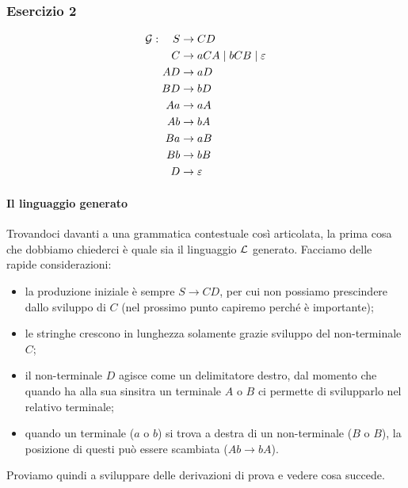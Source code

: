 \documentclass[class=book, crop=false, oneside, 12pt]{standalone}
\begin{document}
  \subsubsection{Esercizio 2}
  \begin{align*}
    \mathcal{G}: \quad S &\to CD \\
    C &\to aCA \mid bCB \mid \varepsilon \\
    AD &\to aD \\
    BD &\to bD \\ \notag
    Aa &\to aA \\
    Ab &\to bA \\ \notag
    Ba &\to aB \\ \notag
    Bb &\to bB \\ \notag
    D &\to \varepsilon \notag
  \end{align*}
  \paragraph{Il linguaggio generato}
  Trovandoci davanti a una grammatica contestuale così articolata, la prima cosa che dobbiamo chiederci è quale sia il linguaggio \(\mathcal{L}\) generato. Facciamo delle rapide considerazioni:
  \begin{itemize}
    \item la produzione iniziale è sempre \(S \to CD\), per cui non possiamo prescindere dallo sviluppo di \(C\) (nel prossimo punto capiremo perché è importante);
    \item le stringhe crescono in lunghezza solamente grazie sviluppo del non-terminale \(C\);
    \item il non-terminale \(D\) agisce come un delimitatore destro, dal momento che quando ha alla sua sinsitra un terminale \(A\) o \(B\) ci permette di svilupparlo nel relativo terminale;
    \item quando un terminale (\(a\) o \(b\)) si trova a destra di un non-terminale (\(B\) o \(B\)), la posizione di questi può essere scambiata (\(Ab \to bA\)).
  \end{itemize}
  Proviamo quindi a sviluppare delle derivazioni di prova e vedere cosa succede.
\end{document}
